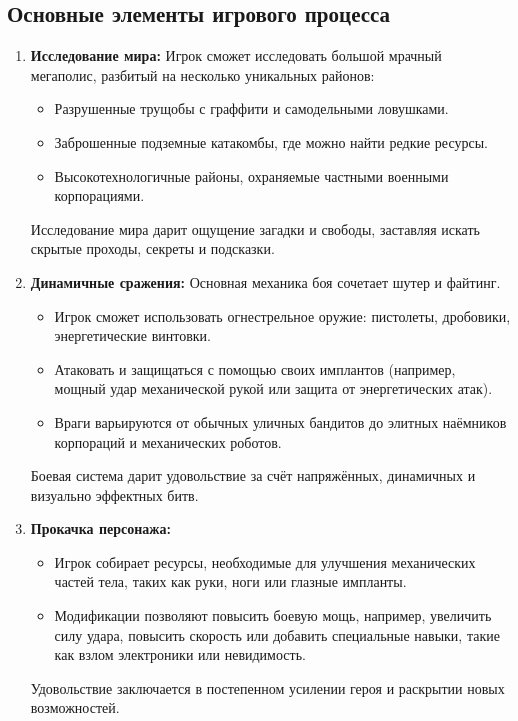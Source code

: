 \documentclass{article}
\begin{document}
\subsection*{Основные элементы игрового процесса}
\begin{enumerate}
    \item \textbf{Исследование мира:}  
    Игрок сможет исследовать большой мрачный мегаполис, разбитый на несколько уникальных районов:
    \begin{itemize}
        \item Разрушенные трущобы с граффити и самодельными ловушками.
        \item Заброшенные подземные катакомбы, где можно найти редкие ресурсы.
        \item Высокотехнологичные районы, охраняемые частными военными корпорациями.
    \end{itemize}
    Исследование мира дарит ощущение загадки и свободы, заставляя искать скрытые проходы, секреты и подсказки.
    
    \item \textbf{Динамичные сражения:}  
    Основная механика боя сочетает шутер и файтинг.
    \begin{itemize}
        \item Игрок сможет использовать огнестрельное оружие: пистолеты, дробовики, энергетические винтовки.
        \item Атаковать и защищаться с помощью своих имплантов (например, мощный удар механической рукой или защита от энергетических атак).
        \item Враги варьируются от обычных уличных бандитов до элитных наёмников корпораций и механических роботов.
    \end{itemize}
    Боевая система дарит удовольствие за счёт напряжённых, динамичных и визуально эффектных битв.
    
    \item \textbf{Прокачка персонажа:}  
    \begin{itemize}
        \item Игрок собирает ресурсы, необходимые для улучшения механических частей тела, таких как руки, ноги или глазные импланты.
        \item Модификации позволяют повысить боевую мощь, например, увеличить силу удара, повысить скорость или добавить специальные навыки, такие как взлом электроники или невидимость.
    \end{itemize}
    Удовольствие заключается в постепенном усилении героя и раскрытии новых возможностей.
    

\end{enumerate}
\end{document}
